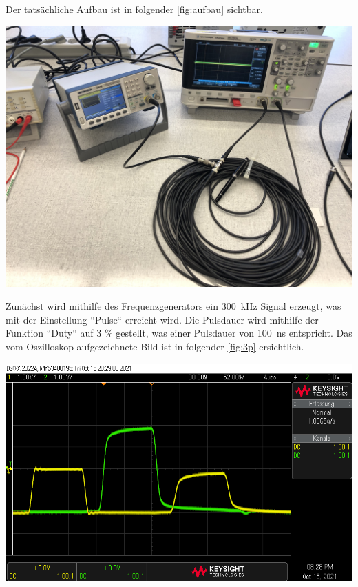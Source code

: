 \documentclass[11pt,ngerman]{scrartcl}
\begin{document}
\noindent Der tatsächliche Aufbau ist in folgender \autoref{fig:aufbau} sichtbar.

\begin{center}
	\begin{minipage}[t]{0.7\textwidth}
		\includegraphics[width=\textwidth]{aufbau}
		\label{fig:aufbau}
	\end{minipage}
\end{center}

\noindent Zunächst wird mithilfe des Frequenzgenerators ein \SI{300}{\kHz} Signal erzeugt, was mit der Einstellung ``Pulse`` erreicht wird. Die Pulsdauer wird mithilfe der Funktion ``Duty`` auf 3 \% gestellt, was einer Pulsdauer von \SI{100}{\ns} entspricht. Das vom Oszilloskop aufgezeichnete Bild ist in folgender \autoref{fig:3p} ersichtlich.

\begin{center}
	\begin{minipage}[t]{0.7\textwidth}
		\includegraphics[width=\textwidth]{oszi/scope_0_3}
		\label{fig:3p}
	\end{minipage}
\end{center}
\end{document}
